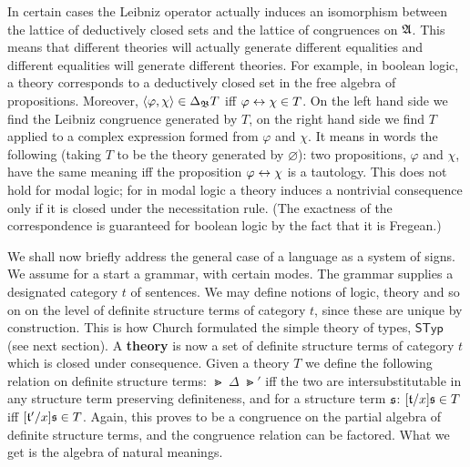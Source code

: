 In certain cases the Leibniz operator actually induces an
isomorphism between the lattice of deductively closed sets and the
lattice of congruences on $\mathfrak{A}$. This means that different theories
will actually generate different equalities and different equalities
will generate different theories. For example, in boolean logic, a
theory corresponds to a deductively closed set in the free algebra
of propositions.  Moreover, $\langle \varphi, \chi\rangle \in \Delta_{\mathfrak{B}}T$ iff
$\varphi \leftrightarrow \chi \in T$. On the left hand side we find the
Leibniz congruence generated by $T$, on the right hand side we
find $T$ applied to a complex expression formed from $\varphi$ and
$\chi$. It means in words the following (taking $T$ to be the
theory generated by $\varnothing$): two propositions, $\varphi$ and
$\chi$, have the same meaning iff the proposition $\varphi \leftrightarrow \chi$ 
is a tautology. This does not hold for modal logic; for in modal logic 
a theory induces a nontrivial consequence only if it
is closed under the necessitation rule. (The exactness of the
correspondence is guaranteed for boolean logic by the fact
that it is Fregean.)

We shall now briefly address the general case of a language as a
system of signs. We assume for a start a grammar, with certain
modes. The grammar supplies a designated category  $t$ of
sentences. We may define notions of logic, theory and so on on the
level of definite structure terms of category $t$, since these are
unique by construction. This is how Church formulated the simple
theory of types, $\mathsf{STyp}$ (see next section). A 
\textbf{theory} 
is now a set of definite structure terms of category $t$ which is 
closed under consequence. Given a theory $T$ we define the following 
relation on definite structure terms: $\Gt\; \Delta\; \Gt'$ iff
the two are intersubstitutable in any structure term preserving
definiteness, and for a structure term $\mathfrak{s}$: $[\mathfrak{t}/x]\mathfrak{s} \in T$
iff $[\mathfrak{t}'/x]\mathfrak{s} \in T$. Again, this proves to be a
congruence on the partial algebra of definite structure terms, and
the congruence relation can be factored. What we get is the
algebra of natural meanings.

